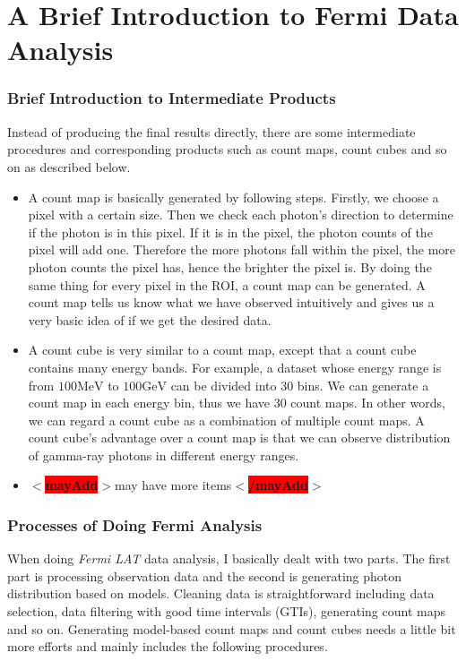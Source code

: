 \documentclass[12pt]{report}
\newcommand{\mayAdd}[1]{
  $<$\colorbox{red}{\textbf{mayAdd}}$>$#1$<$\colorbox{red}{\textbf{/mayAdd}}$>$
}
\begin{document}
      \section{A Brief Introduction to Fermi Data Analysis}
        \subsubsection{Brief Introduction to Intermediate Products}
          Instead of producing the final results directly, there are some intermediate 
          procedures and corresponding products such as count maps, count cubes and so on as 
          described below.

        \begin{itemize}
          \item A count map is basically generated by following steps. Firstly, we choose a 
            pixel with a certain size. Then we check each photon's direction to determine if 
            the photon is in this pixel. If it is in the pixel, the photon counts of the 
            pixel will add one. Therefore the more photons fall within the pixel, the more 
            photon counts the pixel has, hence the brighter the pixel is. By doing the same 
            thing for every pixel in the ROI, a count map can be generated. A count map tells 
            us know what we have observed intuitively and gives us a very basic idea of if 
            we get the desired data. 
          \item A count cube is very similar to a count map, except that a count cube 
            contains many energy bands. For example, a dataset whose energy range is from 
            $100\mbox{MeV}$ to $100\mbox{GeV}$ can be divided into 30 bins. We can
            generate a count map in each energy bin, thus we have 30 count maps. In other 
            words, we can regard a count cube as a combination of multiple count maps. 
            A count cube's advantage over a count map is that we can 
            observe distribution of gamma-ray photons in different energy ranges. 
          \item \mayAdd{may have more items}
        \end{itemize}

        \subsubsection{Processes of Doing Fermi Analysis}
          When doing \textit{Fermi LAT} data analysis, I basically dealt with two parts. The 
          first part is processing observation data and the second is generating photon 
          distribution based on models. Cleaning data is straightforward including data 
          selection, data filtering with good time intervals (GTIs), generating count maps 
          and so on. Generating model-based count maps and count cubes needs a little bit 
          more efforts and mainly includes the following procedures. 
\end{document}

